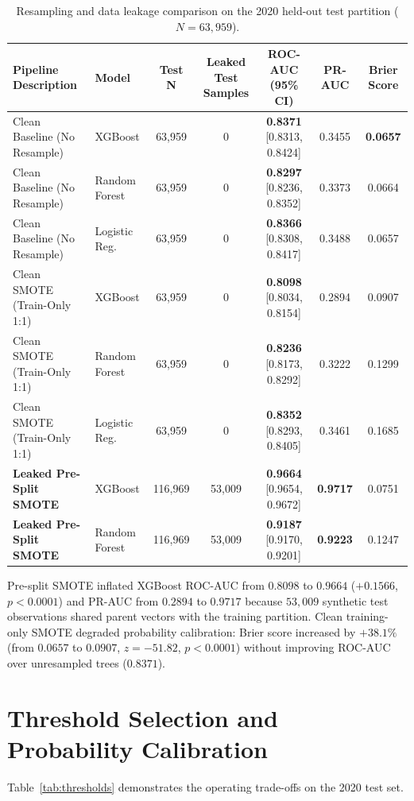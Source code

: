 \documentclass[11pt,a4paper]{article}
\begin{document}
\begin{table}[htbp]
\centering
\small
\caption{Resampling and data leakage comparison on the 2020 held-out test partition ($N = 63,959$).}
\label{tab:leakage}
\begin{tabular}{llccccc}
\toprule
Pipeline Description & Model & Test N & Leaked Test Samples & ROC-AUC (95\% CI) & PR-AUC & Brier Score \\
\midrule
Clean Baseline (No Resample) & XGBoost & 63,959 & 0 & \textbf{0.8371} [0.8313, 0.8424] & 0.3455 & \textbf{0.0657} \\
Clean Baseline (No Resample) & Random Forest & 63,959 & 0 & \textbf{0.8297} [0.8236, 0.8352] & 0.3373 & 0.0664 \\
Clean Baseline (No Resample) & Logistic Reg. & 63,959 & 0 & \textbf{0.8366} [0.8308, 0.8417] & 0.3488 & 0.0657 \\
Clean SMOTE (Train-Only 1:1) & XGBoost & 63,959 & 0 & \textbf{0.8098} [0.8034, 0.8154] & 0.2894 & 0.0907 \\
Clean SMOTE (Train-Only 1:1) & Random Forest & 63,959 & 0 & \textbf{0.8236} [0.8173, 0.8292] & 0.3222 & 0.1299 \\
Clean SMOTE (Train-Only 1:1) & Logistic Reg. & 63,959 & 0 & \textbf{0.8352} [0.8293, 0.8405] & 0.3461 & 0.1685 \\
\textbf{Leaked Pre-Split SMOTE} & XGBoost & 116,969 & 53,009 & \textbf{0.9664} [0.9654, 0.9672] & \textbf{0.9717} & 0.0751 \\
\textbf{Leaked Pre-Split SMOTE} & Random Forest & 116,969 & 53,009 & \textbf{0.9187} [0.9170, 0.9201] & \textbf{0.9223} & 0.1247 \\
\bottomrule
\end{tabular}
\end{table}

Pre-split SMOTE inflated XGBoost ROC-AUC from $0.8098$ to $0.9664$ ($+0.1566$, $p < 0.0001$) and PR-AUC from $0.2894$ to $0.9717$ because $53,009$ synthetic test observations shared parent vectors with the training partition. Clean training-only SMOTE degraded probability calibration: Brier score increased by $+38.1\%$ (from $0.0657$ to $0.0907$, $z = -51.82$, $p < 0.0001$) without improving ROC-AUC over unresampled trees ($0.8371$).

\section{Threshold Selection and Probability Calibration}

Table~\ref{tab:thresholds} demonstrates the operating trade-offs on the 2020 test set.
\end{document}
